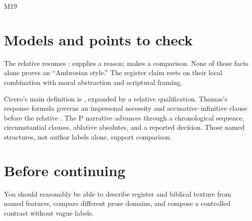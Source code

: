 \begin{courseunit}{M19}
\ifsolutions
\section{Models and points to check}
The relative  resumes ;  supplies a
reason;  makes a comparison.  None of those facts
alone proves an ``Ambrosian style.''  The register claim rests on their local
combination with moral abstraction and scriptural framing.

Cicero's main definition is , expanded by a
relative qualification.  Thomas's response formula governs an impersonal
necessity and accusative--infinitive clause before the relative
.  The P narrative advances through a
chronological sequence, circumstantial clauses, ablative absolutes, and a
reported decision.  Those named structures, not author labels alone, support
comparison.
\else
\section{Before continuing}
You should reasonably be able to describe register and biblical texture from
named features, compare different prose domains, and compose a controlled
contrast without vague labels.
\fi
\end{courseunit}

